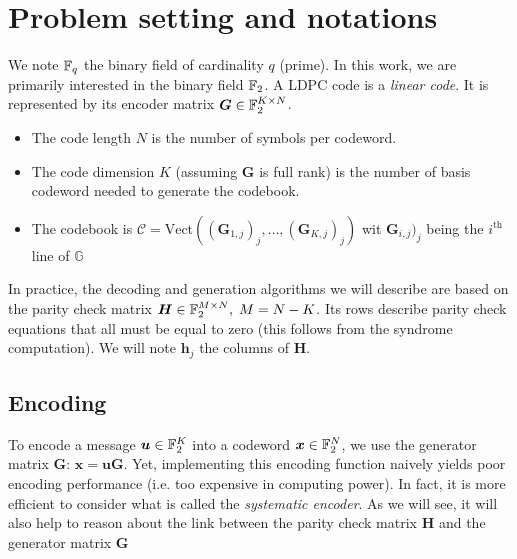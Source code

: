 \section{Problem setting and notations}

We note $\mathbb{F}_q$ the binary field  of cardinality $q$ (prime). In this work, we
are primarily interested in the binary field $\mathbb{F}_2$. A LDPC code is a
\textit{linear code}. It is represented by its encoder matrix $\bm{G} \in
    \mathbb{F}_2^{K \times N}$.
\begin{itemize}
    \item The code length $N$ is the number of symbols per codeword.
    \item The code dimension $K$ (assuming $\bm{G}$ is full rank) is the number
          of basis codeword needed to generate the codebook.
    \item The codebook is $\mathcal{C} = \text{Vect}((\bm{G}_{1,j})_j, \dots,
              (\bm{G}_{K,j})_j)$ wit $\bm{G}_{i,j})_j$ being the $i^\text{th}$
          line of $\mathbb{G}$
\end{itemize}

In practice, the decoding and generation algorithms we will describe are based
on the parity check matrix $\bm{H} \in \mathbb{F}_2^{M \times N}, \; M = N - K$. Its rows
describe parity check equations that all must be equal to zero (this follows
from the syndrome computation). We will note $\bm{h}_j$ the columns of $\bm{H}$.

\subsection{Encoding}
To encode a message $\bm{u} \in \mathbb{F}_2^K$ into a codeword $\bm{x} \in \mathbb{F}_2^N$, we
use the generator matrix $\bm{G}$: $\bm{x} = \bm{u} \bm{G}$. Yet, implementing
this encoding function naively yields poor encoding performance (i.e. too
expensive in computing power). In fact, it is more efficient to consider what is
called the \textit{systematic encoder}. As we will see, it will also help to
reason about the link between the parity check matrix $\bm{H}$ and the generator
matrix $\bm{G}$

